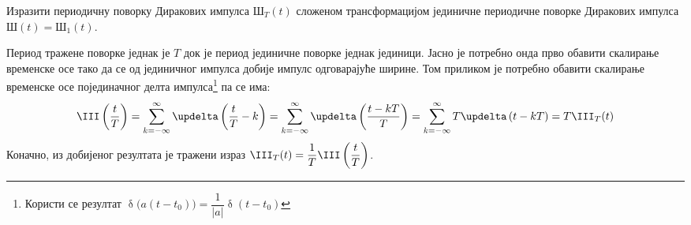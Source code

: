 \PID Изразити периодичну поворку Диракових импулса $\text{Ш}_T(t)$ 
сложеном трансформацијом 
јединичне периодичне поворке Диракових импулса $\text{Ш}(t) = \text{Ш}_1(t)$.

\indent 
\RESENJE  Период тражене поворке једнак је $T$ док је период јединичне поворке једнак
јединици. Јасно је потребно онда прво обавити скалирање временске осе тако да се од јединичног 
импулса добије импулс одговарајуће ширине. Том приликом је потребно обавити скалирање 
временске осе појединачног делта импулса\footnote{Користи се резултат 
$\updelta\bigl(a(t-t_0)\bigr) = \dfrac{1}{|a|} \updelta(t - t_0)$} па се има:
\begin{equation}
    \III\left(\dfrac tT\right) = 
    \sum_{k = -\infty}^{\infty} 
    \updelta \left( \dfrac tT - k \right)
    =
    \sum_{k = -\infty}^{\infty} 
    \updelta \left( \dfrac{t - kT}{T} \right) 
    = 
    \sum_{k = -\infty}^{\infty} 
    T \updelta \left( t - kT \right) 
    = T \III_T(t)
\end{equation}
Коначно, из добијеног резултата је тражени израз $\III_T(t) = \dfrac1T \III\left(\dfrac tT\right)$.
\vfill